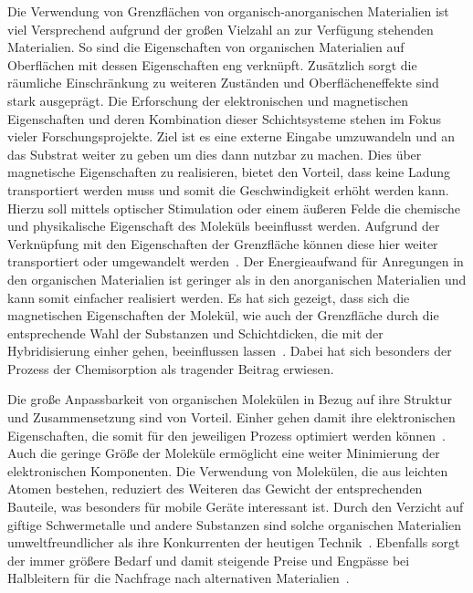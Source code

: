     Die Verwendung von Grenzflächen von organisch-anorganischen Materialien ist viel Versprechend aufgrund der großen Vielzahl an zur Verfügung stehenden Materialien.
    So sind die Eigenschaften von organischen Materialien auf Oberflächen mit dessen Eigenschaften eng verknüpft.
    Zusätzlich sorgt die räumliche Einschränkung zu weiteren Zuständen und Oberflächeneffekte sind stark ausgeprägt.
    Die Erforschung der elektronischen und magnetischen Eigenschaften und deren Kombination dieser Schichtsysteme stehen im Fokus vieler Forschungsprojekte.
    Ziel ist es eine externe Eingabe umzuwandeln und an das Substrat weiter zu geben um dies dann nutzbar zu machen.
    Dies über magnetische Eigenschaften zu realisieren, bietet den Vorteil, dass keine Ladung transportiert werden muss und somit die Geschwindigkeit erhöht werden kann.
    Hierzu soll mittels optischer Stimulation oder einem äußeren Felde die chemische und physikalische Eigenschaft des Moleküls beeinflusst werden.
    Aufgrund der Verknüpfung mit den Eigenschaften der Grenzfläche können diese hier weiter transportiert oder umgewandelt werden~\cite{IF_16}.
    Der Energieaufwand für Anregungen in den organischen Materialien ist geringer als in den anorganischen Materialien und kann somit einfacher realisiert werden.
    Es hat sich gezeigt, dass sich die magnetischen Eigenschaften der Molekül, wie auch der Grenzfläche durch die entsprechende Wahl der Substanzen und Schichtdicken, die mit der Hybridisierung einher gehen, beeinflussen lassen~\cite{IF_16}.
    Dabei hat sich besonders der Prozess der Chemisorption als tragender Beitrag erwiesen.

    Die große Anpassbarkeit von organischen Molekülen in Bezug auf ihre Struktur und Zusammensetzung sind von Vorteil.
    Einher gehen damit ihre elektronischen Eigenschaften, die somit für den jeweiligen Prozess optimiert werden können~\cite{scholl_chapter_2018}.
    Auch die geringe Größe der Moleküle ermöglicht eine weiter Minimierung der elektronischen Komponenten.
    Die Verwendung von Molekülen, die aus leichten Atomen bestehen, reduziert des Weiteren das Gewicht der entsprechenden Bauteile, was besonders für mobile Geräte interessant ist.
    Durch den Verzicht auf giftige Schwermetalle und andere Substanzen sind solche organischen Materialien umweltfreundlicher als ihre Konkurrenten der heutigen Technik~\cite{scholl_chapter_2018}.
    Ebenfalls sorgt der immer größere Bedarf und damit steigende Preise und Engpässe bei Halbleitern für die Nachfrage nach alternativen Materialien~\cite{Idealo}.


